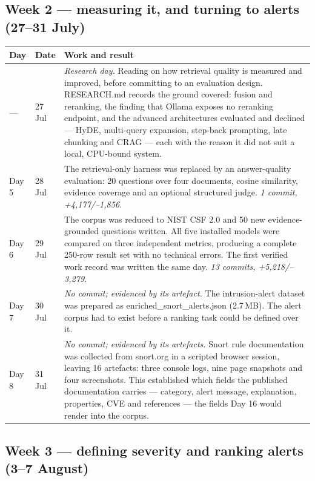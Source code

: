 \documentclass[11pt,a4paper]{article}
\newcommand{\code}[1]{{\small\ttfamily #1}}
\begin{document}
\subsection{Week 2 --- measuring it, and turning to alerts (27--31 July)}

{\small
\begin{tabularx}{\textwidth}{@{}p{15mm} p{11mm} L@{}}
\toprule
\textbf{Day} & \textbf{Date} & \textbf{Work and result} \\
\midrule
\endhead
--- & 27 Jul & \emph{Research day.} Reading on how retrieval quality is measured and
  improved, before committing to an evaluation design. \code{RESEARCH.md} records the
  ground covered: fusion and reranking, the finding that Ollama exposes no reranking
  endpoint, and the advanced architectures evaluated and declined --- HyDE, multi-query
  expansion, step-back prompting, late chunking and CRAG --- each with the reason it did
  not suit a local, CPU-bound system. \\
Day 5 & 28 Jul & The retrieval-only harness was replaced by an answer-quality
  evaluation: 20 questions over four documents, cosine similarity, evidence coverage
  and an optional structured judge. \emph{1 commit, +4{,}177/--1{,}856.} \\
Day 6 & 29 Jul & The corpus was reduced to NIST CSF 2.0 and 50 new evidence-grounded
  questions written. All five installed models were compared on three independent
  metrics, producing a complete 250-row result set with no technical errors. The first
  verified work record was written the same day.
  \emph{13 commits, +5{,}218/--3{,}279.} \\
Day 7 & 30 Jul & \emph{No commit; evidenced by its artefact.} The intrusion-alert
  dataset was prepared as \code{enriched\_snort\_alerts.json} (2.7\,MB). The alert
  corpus had to exist before a ranking task could be defined over it. \\
Day 8 & 31 Jul & \emph{No commit; evidenced by its artefacts.} Snort rule
  documentation was collected from snort.org in a scripted browser session, leaving 16
  artefacts: three console logs, nine page snapshots and four screenshots. This
  established which fields the published documentation carries --- category, alert
  message, explanation, properties, CVE and references --- the fields Day 16 would
  render into the corpus. \\
\bottomrule
\end{tabularx}
}

\subsection{Week 3 --- defining severity and ranking alerts (3--7 August)}
\end{document}
